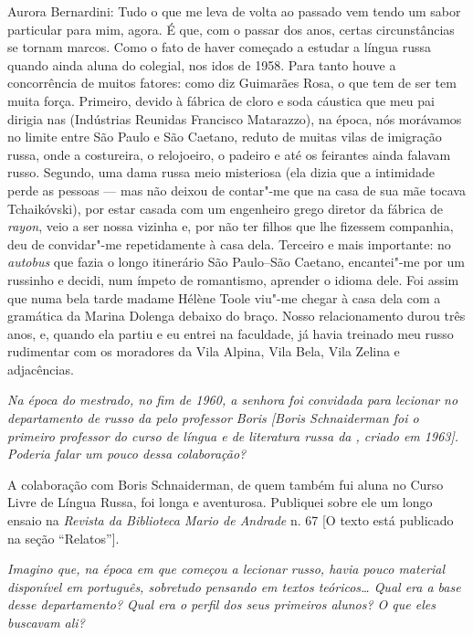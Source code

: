 \noindent
Aurora Bernardini: Tudo o que me leva de volta ao passado vem tendo um sabor particular
para mim, agora. É que, com o passar dos anos, certas circunstâncias se
tornam marcos. Como o fato de haver começado a estudar a língua russa
quando ainda aluna do colegial, nos idos de 1958. Para tanto houve a
concorrência de muitos fatores: como diz Guimarães Rosa, o que tem de
ser tem muita força. Primeiro, devido à fábrica de cloro e soda cáustica
que meu pai dirigia nas  (Indústrias Reunidas Francisco Matarazzo),
na época, nós morávamos no limite entre São Paulo e São Caetano, reduto
de muitas vilas de imigração russa, onde a costureira, o relojoeiro, o
padeiro e até os feirantes ainda falavam russo. Segundo, uma dama russa
meio misteriosa (ela dizia que a intimidade perde as pessoas --- mas não
deixou de contar"-me que na casa de sua mãe tocava Tchaikóvski), por
estar casada com um engenheiro grego diretor da fábrica de \emph{rayon}, veio a
ser nossa vizinha e, por não ter filhos que lhe fizessem companhia, deu
de convidar"-me repetidamente à casa dela. Terceiro e mais importante: no
\emph{autobus} que fazia o longo itinerário São Paulo--São Caetano, encantei"-me
por um russinho e decidi, num ímpeto de romantismo, aprender o idioma
dele. Foi assim que numa bela tarde madame Hélène Toole viu"-me chegar à
casa dela com a gramática da Marina Dolenga debaixo do braço. Nosso
relacionamento durou três anos, e, quando ela partiu e eu entrei na
faculdade, já havia treinado meu russo rudimentar com os moradores da
Vila Alpina, Vila Bela, Vila Zelina e adjacências.

\medskip

\emph{Na época do mestrado, no fim de 1960, a senhora foi convidada para
lecionar no departamento de russo da  pelo professor Boris [Boris
Schnaiderman foi o primeiro professor do curso de língua e de literatura
russa da , criado em 1963]. Poderia falar um pouco dessa
colaboração?}

A colaboração com Boris Schnaiderman, de quem também fui aluna no Curso Livre de Língua Russa, foi longa e
aventurosa. Publiquei sobre ele um longo ensaio na \emph{Revista da
Biblioteca Mario de Andrade} n. 67 [O texto está publicado na seção
``Relatos''].

\medskip

\emph{Imagino que, na época em que começou a lecionar russo, havia pouco
material disponível em português, sobretudo pensando em textos
teóricos\ldots{} Qual era a base desse departamento? Qual era o perfil dos
seus primeiros alunos? O que eles buscavam ali?}

